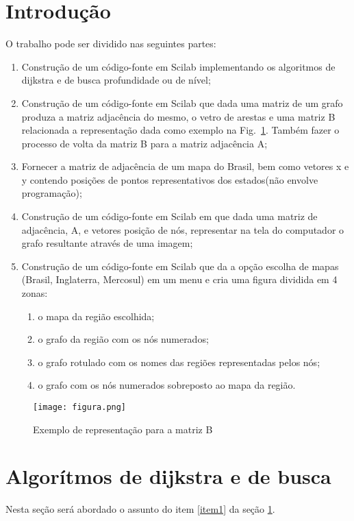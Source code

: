 \section{Introdução}\label{toin}
O trabalho pode ser dividido nas seguintes partes:
\begin{enumerate}
\item \label{item1}Construção de um código-fonte em Scilab implementando os algoritmos de dijkstra e de busca profundidade ou de nível;
\item \label{item2}Construção de um código-fonte em Scilab que dada uma matriz de um grafo produza a matriz adjacência do mesmo, o vetro de arestas e uma matriz B relacionada a representação dada como exemplo na Fig.~\ref{fig1}. Também fazer o processo de volta da matriz B para a matriz adjacência A;
\item \label{item3}Fornecer a matriz de adjacência de um mapa do Brasil, bem como vetores x e y contendo posições de pontos representativos dos estados(não envolve programação);
\item \label{item4}Construção de um código-fonte em Scilab em que dada uma matriz de adjacência, A, e vetores posição de nós, representar na tela do computador o grafo resultante através de uma imagem;
\item \label{item5}Construção de um código-fonte em Scilab que da a opção escolha de mapas (Brasil, Inglaterra, Mercosul) em um menu e cria uma figura dividida em 4 zonas: 
	\begin{enumerate}
	\item \label{item5.1}o mapa da região escolhida;
	\item \label{item5.2}o grafo da região com os nós numerados;
	\item \label{item5.3}o grafo rotulado com os nomes das regiões representadas pelos nós;
	\item \label{item5.4}o grafo com os nós numerados sobreposto ao mapa da região.
	\end{enumerate}
\end{enumerate}

\begin{figure}[!htb]
\centering
\texttt{[image: figura.png]}
%
\caption{Exemplo de representação para a matriz B}
\label{fig1}
\end{figure}

\newpage
\section{Algorítmos de dijkstra e de busca}\label{algoritmos}
Nesta seção será abordado o assunto do item \ref{item1} da seção \ref{toin}.
